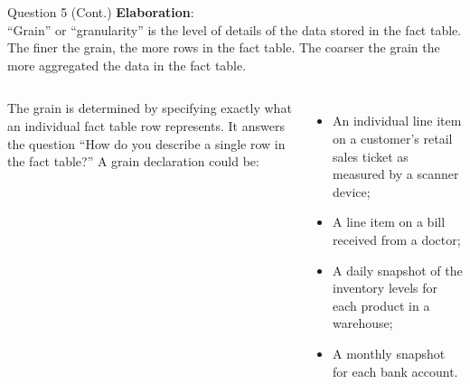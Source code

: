 \begin{frame}[fragile]{Question 5 (Cont.)}
	\textbf{Elaboration}:\\\vspace{5pt}
	``Grain'' or ``granularity'' is the level of details of the data stored in the fact table. The finer the grain, the more rows in the fact table. The coarser the grain the more aggregated the data in the fact table.
	\\\vspace{5pt}
	\begin{columns}[t,onlytextwidth]
		The grain is determined by specifying exactly what an individual fact table row represents. It answers the question ``How do you describe a single row in the fact table?'' A grain declaration could be:\\
		\begin{itemize}
			\item An individual line item on a customer's retail sales ticket as measured by a scanner device;
			\item A line item on a bill received from a doctor;
			\item A daily snapshot of the inventory levels for each product in a warehouse;
			\item A monthly snapshot for each bank account.
		\end{itemize}
		

\end{columns}
\end{frame}
